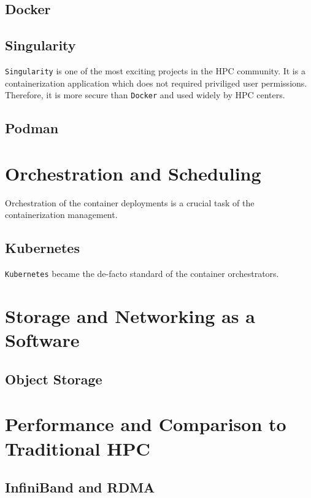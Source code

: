 \subsection{Docker}
\subsection{Singularity}
\texttt{Singularity} is one of the most exciting projects in the HPC community. It is a containerization 
application which does not required priviliged user permissions. Therefore, it is more secure than
\texttt{Docker} and used widely by HPC centers.
\subsection{Podman}

\section{Orchestration and Scheduling}
Orchestration of the container deployments is a crucial task of the containerization management.
\subsection{Kubernetes}
\texttt{Kubernetes} became the de-facto standard of the container orchestrators.

\section{Storage and Networking as a Software}
\subsection{Object Storage}

\section{Performance and Comparison to Traditional HPC}
\subsection{InfiniBand and RDMA}

